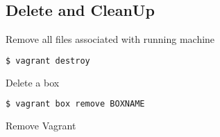\documentclass[a4paper,9pt]{extarticle}
\begin{document}
\begin{multicols*}{2}
\section{Delete and CleanUp}
Remove all files associated with running machine
\begin{lstlisting}[language=bash]
$ vagrant destroy
\end{lstlisting}
Delete a box
\begin{lstlisting}[language=bash]
$ vagrant box remove BOXNAME
\end{lstlisting}
Remove Vagrant 




\end{multicols*}
\end{document}
